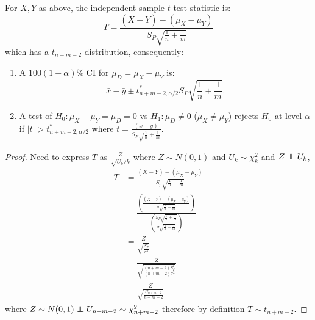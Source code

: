 \documentclass[10pt, a4paper]{article}
\begin{document}
\begin{proposition}
    For $X, Y$ as above,
    the independent sample $t$-test statistic is:
    \[
    T = \frac{(\bar{X} - \bar{Y}) - (\mu_{X} - \mu_{Y})}{S_{P}\sqrt{\frac{1}{n} + \frac{1}{m}}}
    \]
    which has a $t_{n + m - 2}$ distribution,
    consequently:
    \begin{enumerate}[label = (\roman*)]
        \item A $100(1 - \alpha)\%$ CI for $\mu_{D} = \mu_{X} - \mu_{Y}$ is:
        \[
        \bar{x} - \bar{y} \pm t_{n + m - 2, \alpha / 2}^{*}S_{P}\sqrt{\frac{1}{n} + \frac{1}{m}}.
        \]
        
        \item A test of $H_0 : \mu_{X} - \mu_{Y} = \mu_{D} = 0$ vs $H_1 : \mu_{D} \neq 0$
        ($\mu_{X} \neq \mu_{Y}$)
        rejects $H_0$ at level $\alpha$ if $|t| > t_{n + m - 2, \alpha / 2}^{*}$ where $t = \frac{(\bar{x} - \bar{y})}{S_{P}\sqrt{\frac{1}{n} + \frac{1}{m}}}$.
    \end{enumerate}

    \begin{proof}\phantom{}
        Need to express $T$ as $\frac{Z}{\sqrt{U_k / k}}$ where $Z \sim N(0, 1)$ and $U_k \sim \chi_{k}^{2}$ and $Z \independent U_k$,
        \begin{align*}
            T &= \frac{(\bar{X} - \bar{Y}) - (\mu_{X} - \mu_{Y})}{S_p\sqrt{\frac{1}{n} + \frac{1}{m}}} \\
            &= \frac{\left(\frac{(\bar{X} - \bar{Y}) - (\mu_{X} - \mu_{Y})}{\sigma\sqrt{\frac{1}{n} + \frac{1}{m}}}\right)}{\left(\frac{S_{P}\sqrt{\frac{1}{n} + \frac{1}{m}}}{\sigma\sqrt{\frac{1}{n} + \frac{1}{m}}}\right)} \\
            &= \frac{Z}{\sqrt{\frac{S_{P} ^ 2}{\sigma ^ 2}}} \\
            &= \frac{Z}{\sqrt{\frac{(n + m - 2)S_{P} ^ 2}{(n + m - 2)\sigma ^ 2}}} \\
            &= \frac{Z}{\sqrt{\frac{U_{n + m - 2}}{n + m - 2}}}
        \end{align*}
        where $Z \sim N(0, 1) \independent U_{n + m - 2} \sim \chi_{n + m - 2}^{2}$ therefore by definition $T \sim t_{n + m - 2}$.
    \end{proof}
\end{proposition}
\end{document}

